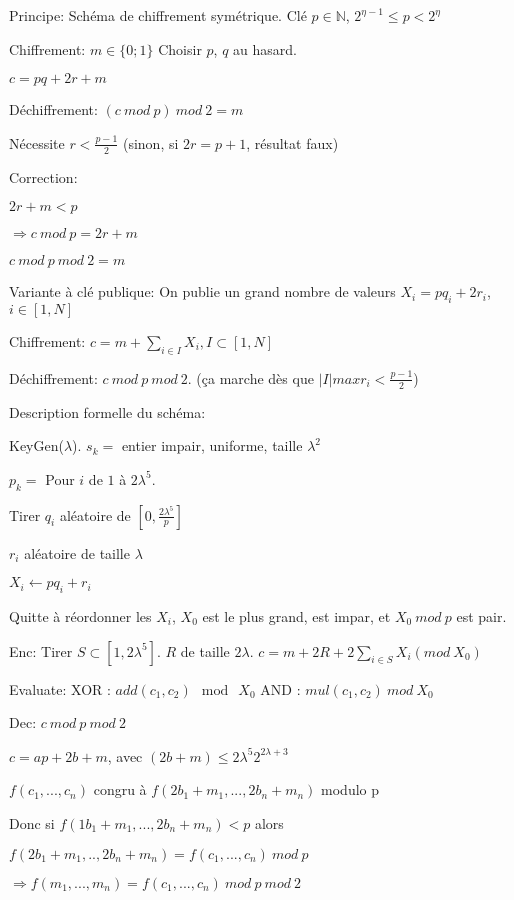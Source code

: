 Principe: Schéma de chiffrement symétrique. Clé $p \in \mathbb{N}$, $2^{\eta-1} \leq p < 2^{\eta}$

Chiffrement: $m \in \{ 0 ; 1 \}$
Choisir $p$, $q$ au hasard.

$c=pq+2 r+m$

Déchiffrement:
$(c \ mod \ p) \ mod \ 2 = m$

Nécessite $r < \frac{p-1}{2}$ (sinon, si $2 r=p+1$, résultat faux)

Correction: 

$2 r + m < p$

$\Rightarrow c \ mod \ p = 2 r + m$

$c \ mod \ p \ mod \ 2 =m$

Variante à clé publique: On publie un grand nombre de valeurs $X_i = p q_i + 2 r_i$, $i \in [1,N]$

Chiffrement: $c=m+ \sum_{i \in I} X_i, I \subset[1,N]$

Déchiffrement: $c \ mod \ p \ mod \ 2$. (ça marche dès que $|I|max r_i < \frac{p-1}{2}$)

Description formelle du schéma:

KeyGen($\lambda$). $s_k =$ entier impair, uniforme, taille $\lambda^2$

$p_k =$ Pour $i$ de $1$ à $2 \lambda^5$.

Tirer $q_i$ aléatoire de $[0, \frac{2 \lambda^5}{p}]$

$r_i$ aléatoire de taille $\lambda$

$X_i \leftarrow p q_i + r_i$

Quitte à réordonner les $X_i$, $X_0$ est le plus grand, est impar, et $X_0 \ mod \ p$ est pair.

Enc: Tirer $S \subset [1, 2 \lambda^5]$. $R$ de taille $2 \lambda$. $c=m+2 R+2 \sum_{i \in S} X_i (mod \ X_0)$

Evaluate: XOR : $add(c_1,c_2) \mod \ X_0$
AND : $mul(c_1,c_2) \ mod \ X_0$

Dec: $c \ mod \ p \ mod \ 2$

\begin{lemma}
$c=a p + 2 b +m$, avec $(2 b +m)\leq 2 \lambda^5 2^{2 \lambda + 3}$
\end{lemma}

$f(c_1,...,c_n)$ congru à $f(2 b_1+m_1,..., 2 b_n+m_n)$ modulo p

Donc si $f(1 b_1+m_1,...,2 b_n+ m_n)<p$ alors

$f(2 b_1+m_1,..,2 b_n + m_n)=f(c_1,...,c_n) \ mod \ p$

$\Rightarrow f(m_1,...,m_n)=f(c_1,...,c_n) \ mod \ p \ mod \ 2$

